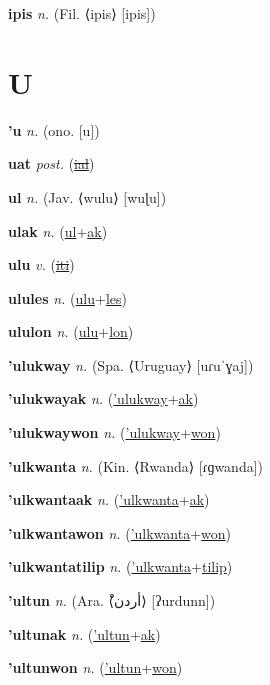 \textbf{\hypertarget{ipis}{ipis}} \textit{n.} (Fil. ⟨ipis⟩ [ipis])


\section{U}

\textbf{\hypertarget{'u}{'u}} \textit{n.} (ono. [u])


\textbf{\hypertarget{uat}{uat}} \textit{post.} (\hyperlink{ial}{\sout{ial}})


\textbf{\hypertarget{ul}{ul}} \textit{n.} (Jav. ⟨wulu⟩ [wuɭu])


\textbf{\hypertarget{ulak}{ulak}} \textit{n.} (\hyperlink{ul}{ul}+\allowbreak \hyperlink{ak}{ak})


\textbf{\hypertarget{ulu}{ulu}} \textit{v.} (\hyperlink{iti}{\sout{iti}})


\textbf{\hypertarget{ulules}{ulules}} \textit{n.} (\hyperlink{ulu}{ulu}+\allowbreak \hyperlink{les}{les})


\textbf{\hypertarget{ululon}{ululon}} \textit{n.} (\hyperlink{ulu}{ulu}+\allowbreak \hyperlink{lon}{lon})


\textbf{\hypertarget{'ulukway}{'ulukway}} \textit{n.} (Spa. ⟨Uruguay⟩ [uɾuˈɣaj])


\textbf{\hypertarget{'ulukwayak}{'ulukwayak}} \textit{n.} (\hyperlink{'ulukway}{'ulukway}+\allowbreak \hyperlink{ak}{ak})


\textbf{\hypertarget{'ulukwaywon}{'ulukwaywon}} \textit{n.} (\hyperlink{'ulukway}{'ulukway}+\allowbreak \hyperlink{won}{won})


\textbf{\hypertarget{'ulkwanta}{'ulkwanta}} \textit{n.} (Kin. ⟨Rwanda⟩ [ɾɡwanda])


\textbf{\hypertarget{'ulkwantaak}{'ulkwantaak}} \textit{n.} (\hyperlink{'ulkwanta}{'ulkwanta}+\allowbreak \hyperlink{ak}{ak})


\textbf{\hypertarget{'ulkwantawon}{'ulkwantawon}} \textit{n.} (\hyperlink{'ulkwanta}{'ulkwanta}+\allowbreak \hyperlink{won}{won})


\textbf{\hypertarget{'ulkwantatilip}{'ulkwantatilip}} \textit{n.} (\hyperlink{'ulkwanta}{'ulkwanta}+\allowbreak \hyperlink{tilip}{tilip})


\textbf{\hypertarget{'ultun}{'ultun}} \textit{n.} (Ara. ⟨{\arabics{}ْأردن}⟩ [ʔurdunn])


\textbf{\hypertarget{'ultunak}{'ultunak}} \textit{n.} (\hyperlink{'ultun}{'ultun}+\allowbreak \hyperlink{ak}{ak})


\textbf{\hypertarget{'ultunwon}{'ultunwon}} \textit{n.} (\hyperlink{'ultun}{'ultun}+\allowbreak \hyperlink{won}{won})


